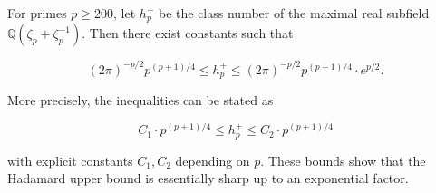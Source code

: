 For primes $p \geq 200$, let $h_p^+$ be the class number of the maximal real subfield $\mathbb{Q}(\zeta_p + \zeta_p^{-1})$. Then there exist constants such that

$$(2\pi)^{-p/2} p^{(p+1)/4} \leq h_p^+ \leq (2\pi)^{-p/2} p^{(p+1)/4} \cdot e^{p/2}.$$

More precisely, the inequalities can be stated as

$$C_1 \cdot p^{(p+1)/4} \leq h_p^+ \leq C_2 \cdot p^{(p+1)/4}$$

with explicit constants $C_1, C_2$ depending on $p$. These bounds show that the Hadamard upper bound is essentially sharp up to an exponential factor.
